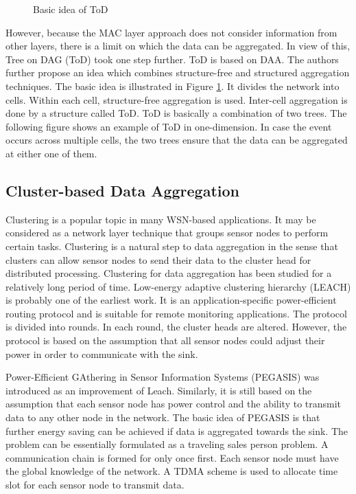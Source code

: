 \begin{figure}
\centering
{}
\caption{Basic idea of ToD}
\label{fig:ToD}
\end{figure}

However, because the MAC layer approach does not consider information from other layers, there is a limit on which the data can be aggregated. In view of this, Tree on DAG (ToD) \cite{tod} took one step further. ToD is based on DAA. The authors further propose an idea which combines structure-free and structured aggregation techniques. The basic idea is illustrated in Figure \ref{fig:ToD}. It divides the network into cells. Within each cell, structure-free aggregation is used. Inter-cell aggregation is done by a structure called ToD. ToD is basically a combination of two trees. The following figure shows an example of ToD in one-dimension. In case the event occurs across multiple cells, the two trees ensure that the data can be aggregated at either one of them.

\subsection{Cluster-based Data Aggregation}
Clustering is a popular topic in many WSN-based applications. It may be considered as a network layer technique that groups sensor nodes to perform certain tasks. Clustering is a natural step to data aggregation in the sense that clusters can allow sensor nodes to send their data to the cluster head for distributed processing. Clustering for data aggregation has been studied for a relatively long period of time. Low-energy adaptive clustering hierarchy (LEACH) \cite{leach} is probably one of the earliest work. It is an application-specific power-efficient routing protocol and is suitable for remote monitoring applications. The protocol is divided into rounds. In each round, the cluster heads are altered. However, the protocol is based on the assumption that all sensor nodes could adjust their power in order to communicate with the sink.

Power-Efficient GAthering in Sensor Information Systems (PEGASIS) \cite{pegasis} was introduced as an improvement of Leach. Similarly, it is still based on the assumption that each sensor node has power control and the ability to transmit data to any other node in the network. The basic idea of PEGASIS is that further energy saving can be achieved if data is aggregated towards the sink. The problem can be essentially formulated as a traveling sales person problem. A communication chain is formed for only once first. Each sensor node must have the global knowledge of the network. A TDMA scheme is used to allocate time slot for each sensor node to transmit data.


